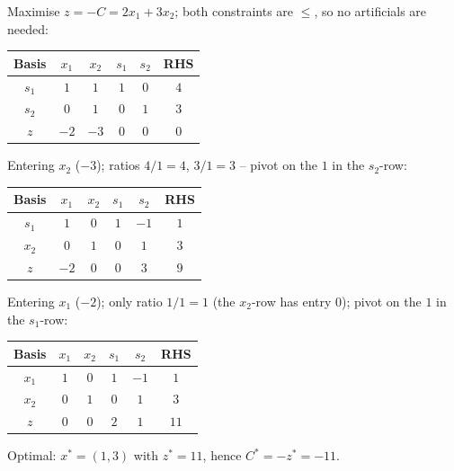 \begin{solutions}
  \item Maximise $z=-C=2x_{1}+3x_{2}$; both constraints are $\le$, so no
        artificials are needed:
        \begin{center}
        \begin{tabular}{c|cccc|c}
        Basis & $x_{1}$ & $x_{2}$ & $s_{1}$ & $s_{2}$ & RHS\\
        \hline
        $s_{1}$ & $1$ & $1$ & $1$ & $0$ & $4$\\
        $s_{2}$ & $0$ & $1$ & $0$ & $1$ & $3$\\
        \hline
        $z$ & $-2$ & $-3$ & $0$ & $0$ & $0$\\
        \end{tabular}
        \end{center}
        Entering $x_{2}$ ($-3$); ratios $4/1=4$, $3/1=3$ -- pivot on the
        $1$ in the $s_{2}$-row:
        \begin{center}
        \begin{tabular}{c|cccc|c}
        Basis & $x_{1}$ & $x_{2}$ & $s_{1}$ & $s_{2}$ & RHS\\
        \hline
        $s_{1}$ & $1$ & $0$ & $1$ & $-1$ & $1$\\
        $x_{2}$ & $0$ & $1$ & $0$ & $1$ & $3$\\
        \hline
        $z$ & $-2$ & $0$ & $0$ & $3$ & $9$\\
        \end{tabular}
        \end{center}
        Entering $x_{1}$ ($-2$); only ratio $1/1=1$ (the $x_{2}$-row has
        entry $0$); pivot on the $1$ in the $s_{1}$-row:
        \begin{center}
        \begin{tabular}{c|cccc|c}
        Basis & $x_{1}$ & $x_{2}$ & $s_{1}$ & $s_{2}$ & RHS\\
        \hline
        $x_{1}$ & $1$ & $0$ & $1$ & $-1$ & $1$\\
        $x_{2}$ & $0$ & $1$ & $0$ & $1$ & $3$\\
        \hline
        $z$ & $0$ & $0$ & $2$ & $1$ & $11$\\
        \end{tabular}
        \end{center}
        Optimal: $x^{*}=(1,3)$ with $z^{*}=11$, hence
        $C^{*}=-z^{*}=-11$.


\end{solutions}
